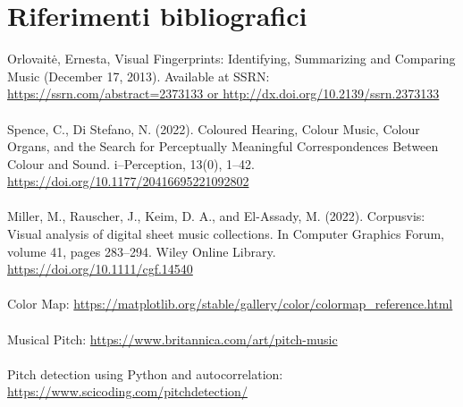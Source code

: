 \documentclass{article}
\begin{document}
\section{Riferimenti bibliografici}
Orlovaitė, Ernesta, Visual Fingerprints: Identifying, Summarizing and Comparing
Music (December 17, 2013). Available at SSRN:
\url{https://ssrn.com/abstract=2373133 or
    http://dx.doi.org/10.2139/ssrn.2373133} \\ \\ Spence, C., Di Stefano, N.
(2022). Coloured Hearing, Colour Music, Colour Organs, and the Search for
Perceptually Meaningful Correspondences Between Colour and Sound. i–Perception,
13(0), 1–42. \url{https://doi.org/10.1177/20416695221092802} \\ \\ Miller, M.,
Rauscher, J., Keim, D. A., and El-Assady, M. (2022). Corpusvis: Visual analysis
of digital sheet music collections. In Computer Graphics Forum, volume 41,
pages 283–294. Wiley Online Library. \url{ https://doi.org/10.1111/cgf.14540}
\\ \\ Color Map:
\url{https://matplotlib.org/stable/gallery/color/colormap_reference.html} \\ \\
Musical Pitch: \url{https://www.britannica.com/art/pitch-music} \\ \\ Pitch
detection using Python and autocorrelation:
\url{https://www.scicoding.com/pitchdetection/}
\end{document}
